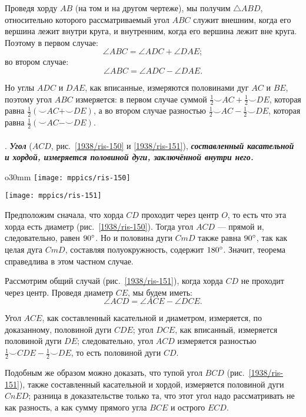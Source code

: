 Проведя хорду $AB$ (на том и на другом чертеже), мы получим $\triangle ABD$, относительно которого рассматриваемый угол $ABC$ служит внешним, когда его вершина лежит внутри круга, и внутренним, когда его вершина лежит вне круга.
Поэтому в первом случае:
\[\angle ABC = \angle ADC+\angle DAE;\]
во втором случае:
\[\angle ABC = \angle ADC-\angle DAE.\]

Но углы $ADC$ и $DAE$, как вписанные, измеряются половинами дуг $AC$ и $BE$, поэтому угол $ABC$ измеряется:
в первом случае суммой
$\tfrac12{\smallsmile}AC+\tfrac12{\smallsmile}DE$, которая равна $\tfrac12({\smallsmile}AC+{\smallsmile}DE)$, а во втором случае разностью $\tfrac12{\smallsmile}AC-\tfrac12{\smallsmile}DE$, которая равна $\tfrac12({\smallsmile}AC-{\smallsmile}DE)$.

\paragraph{}\label{1938/131}
.
\textbf{\emph{Угол}} ($ACD$, рис.~\ref{1938/ris-150} и \ref{1938/ris-151}), \textbf{\emph{составленный касательной и хордой, измеряется половиной дуги, заключённой внутри него.}}

\begin{wrapfigure}{o}{30mm}
\centering
\texttt{[image: mppics/ris-150]}
\caption{}\label{1938/ris-150}
\bigskip
\texttt{[image: mppics/ris-151]}
\caption{}\label{1938/ris-151}
\end{wrapfigure}

Предположим сначала, что хорда $CD$ проходит через центр $O$, то есть что эта хорда есть диаметр (рис.~\ref{1938/ris-150}).
Тогда угол $ACD$ — прямой и,
следовательно, равен $90\degree$.
Но и половина дуги $CmD$ также равна $90\degree$, так как целая дуга $CmD$, составляя полуокружность, содержит $180\degree$.
Значит, теорема справедлива в этом частном случае.

Рассмотрим общий случай (рис.~\ref{1938/ris-151}), когда хорда $CD$ не проходит через центр.
Проведя диаметр $CE$, мы будем иметь:
\[\angle ACD = \angle ACE - \angle DCE.\]

Угол $ACE$, как составленный касательной и диаметром, измеряется, по доказанному, половиной дуги $CDE$;
угол $DCE$, как вписанный, измеряется половиной дуги $DE$;
следовательно, угол $ACD$ измеряется разностью $\tfrac12{\smallsmile}CDE-\tfrac12{\smallsmile}DE$, то есть половиной дуги $CD$.

Подобным же образом можно доказать, что тупой угол $BCD$ (рис.~\ref{1938/ris-151}), также составленный касательной и хордой, измеряется половиной дуги $CnED$;
разница в доказательстве только та, что этот угол надо рассматривать не как разность, а как сумму прямого угла $BCE$ и острого $ECD$.

